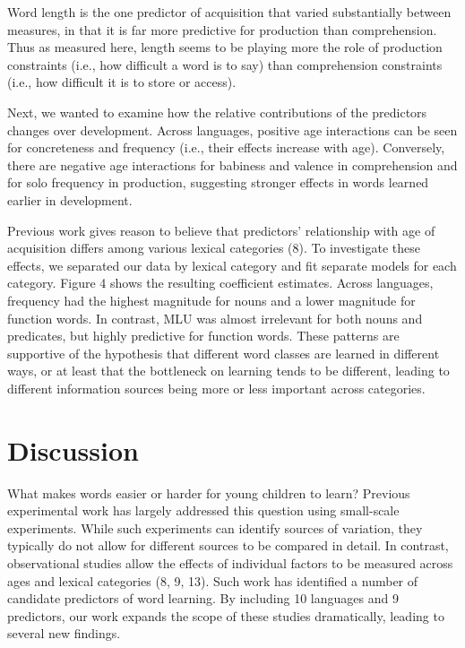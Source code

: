 \documentclass[english,man]{apa6}
\theoremstyle{definition}
\theoremstyle{definition}
\theoremstyle{definition}
\theoremstyle{remark}
\begin{document}
Word length is the one predictor of acquisition that varied
substantially between measures, in that it is far more predictive for
production than comprehension. Thus as measured here, length seems to be
playing more the role of production constraints (i.e., how difficult a
word is to say) than comprehension constraints (i.e., how difficult it
is to store or access).

Next, we wanted to examine how the relative contributions of the
predictors changes over development. Across languages, positive age
interactions can be seen for concreteness and frequency (i.e., their
effects increase with age). Conversely, there are negative age
interactions for babiness and valence in comprehension and for solo
frequency in production, suggesting stronger effects in words learned
earlier in development.

Previous work gives reason to believe that predictors' relationship with
age of acquisition differs among various lexical categories (8). To
investigate these effects, we separated our data by lexical category and
fit separate models for each category. Figure 4 shows the resulting
coefficient estimates. Across languages, frequency had the highest
magnitude for nouns and a lower magnitude for function words. In
contrast, MLU was almost irrelevant for both nouns and predicates, but
highly predictive for function words. These patterns are supportive of
the hypothesis that different word classes are learned in different
ways, or at least that the bottleneck on learning tends to be different,
leading to different information sources being more or less important
across categories.

\section*{Discussion}\label{discussion}

What makes words easier or harder for young children to learn? Previous
experimental work has largely addressed this question using small-scale
experiments. While such experiments can identify sources of variation,
they typically do not allow for different sources to be compared in
detail. In contrast, observational studies allow the effects of
individual factors to be measured across ages and lexical categories (8,
9, 13). Such work has identified a number of candidate predictors of
word learning. By including 10 languages and 9 predictors, our work
expands the scope of these studies dramatically, leading to several new
findings.
\end{document}
